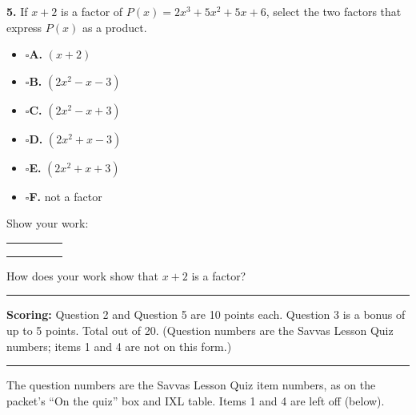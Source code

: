 \documentclass[11pt]{article}
\newcommand{\checkbox}{$\square$\;}
\begin{document}
\vspace{6pt}
\begin{minipage}[t]{0.56\textwidth}
\textbf{5.} If $x+2$ is a factor of $P(x)=2x^3+5x^2+5x+6$, select the two factors that express $P(x)$ as a product.

\vspace{4pt}
\begin{itemize}[leftmargin=1.2em, itemsep=5pt]
\item[] \checkbox \textbf{A.} $(x+2)$
\item[] \checkbox \textbf{B.} $(2x^2-x-3)$
\item[] \checkbox \textbf{C.} $(2x^2-x+3)$
\item[] \checkbox \textbf{D.} $(2x^2+x-3)$
\item[] \checkbox \textbf{E.} $(2x^2+x+3)$
\item[] \checkbox \textbf{F.} not a factor
\end{itemize}
\end{minipage}\hfill
\begin{minipage}[t]{0.40\textwidth}
{\small Show your work:}

\vspace{4pt}
\begin{tabular}{A|CCCC}
\rule{0pt}{18pt}\phantom{-2} & & & & \\
\rule{0pt}{18pt} & & & & \\ 
\rule{0pt}{18pt} & & & & \\
\end{tabular}

\vspace{8pt}
{\small How does your work show that $x+2$ is a factor?}

\vspace{12pt}\rule{\linewidth}{0.4pt}
\end{minipage}

\vfill
\noindent\textbf{Scoring:} Question 2 and Question 5 are 10 points each. Question 3 is a bonus of up to 5 points. Total out of 20. (Question numbers are the Savvas Lesson Quiz numbers; items 1 and 4 are not on this form.)

\newpage
{}

\vspace{4pt}\noindent\rule{\textwidth}{0.6pt}

{\small The question numbers are the Savvas Lesson Quiz item numbers, as on the packet's ``On the quiz'' box and IXL table. Items 1 and 4 are left off (below).}
\end{document}
